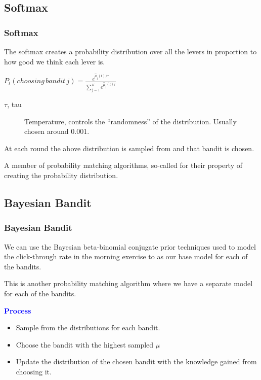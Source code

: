 \documentclass{beamer}
\begin{document}
\subsection{Softmax}
\begin{frame}
  \frametitle{Softmax}
  The softmax creates a probability distribution over all the levers in proportion to how good we think each lever is. \pause

  \begin{center}
    $P_t(choosing\, bandit\, j) = \frac{e^{\hat{\mu}_j(t)/\tau}}{\sum\limits_{j=1}^{K}e^{\hat{\mu}_j(t)\tau}}$
  \end{center}

  \begin{description}
    \item[$\tau$, tau] Temperature, controls the ``randomness'' of the distribution. Usually chosen around 0.001.
  \end{description} \pause

  At each round the above distribution is sampled from and that bandit is chosen. \vspace{2mm} \pause

  A member of probability matching algorithms, so-called for their property of creating the probability distribution.

\end{frame}

\subsection{Bayesian Bandit}
\begin{frame}
  \frametitle{Bayesian Bandit}
  We can use the Bayesian beta-binomial conjugate prior techniques used to model the click-through rate in the morning exercise to as our base model for each of the bandits. \vspace{2mm}

  This is another probability matching algorithm where we have a separate model for each of the bandits. \vspace{4mm} \pause

  \textbf{\textcolor{blue}{Process}}

  \begin{itemize}
    \item Sample from the distributions for each bandit.
    \item Choose the bandit with the highest sampled $\mu$
    \item Update the distribution of the chosen bandit with the knowledge gained from choosing it.
  \end{itemize}
\end{frame}
\end{document}
